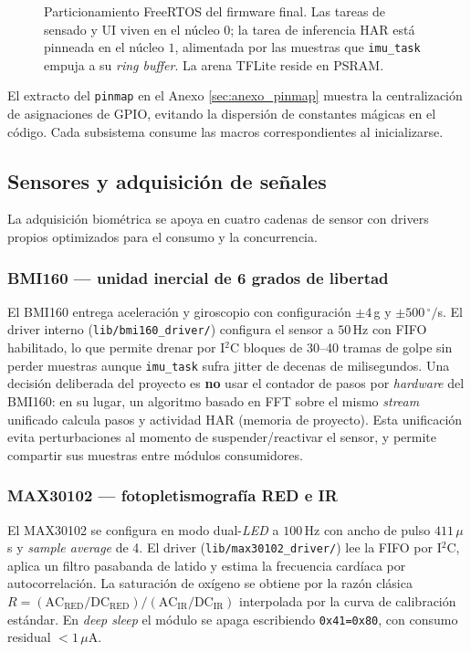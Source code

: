 \documentclass[letterpaper,11pt]{article}
\begin{document}
\begin{figure}[H]
    \centering
    \resizebox{0.88\textwidth}{!}{}
    \caption[Particionamiento FreeRTOS del firmware final]{Particionamiento FreeRTOS del firmware final. Las tareas de sensado y UI viven en el n\'ucleo $0$; la tarea de inferencia HAR est\'a pinneada en el n\'ucleo $1$, alimentada por las muestras que \texttt{imu\_task} empuja a su \textit{ring buffer}. La arena TFLite reside en PSRAM.}
    \label{fig:freertos}
\end{figure}

El extracto del \texttt{pinmap} en el Anexo \ref{sec:anexo_pinmap} muestra la centralizaci\'on de asignaciones de GPIO, evitando la dispersi\'on de constantes m\'agicas en el c\'odigo. Cada subsistema consume las macros correspondientes al inicializarse.

\subsection{Sensores y adquisici\'on de se\~nales}

La adquisici\'on biom\'etrica se apoya en cuatro cadenas de sensor con drivers propios optimizados para el consumo y la concurrencia.

\subsubsection*{BMI160 --- unidad inercial de 6 grados de libertad}
El BMI160 \cite{bmi160_ds} entrega aceleraci\'on y giroscopio con configuraci\'on $\pm 4$\,g y $\pm 500\,^\circ/$s. El driver interno (\texttt{lib/bmi160\_driver/}) configura el sensor a $50$\,Hz con FIFO habilitado, lo que permite drenar por I$^2$C bloques de 30--40 tramas de golpe sin perder muestras aunque \texttt{imu\_task} sufra jitter de decenas de milisegundos. Una decisi\'on deliberada del proyecto es \textbf{no} usar el contador de pasos por \textit{hardware} del BMI160: en su lugar, un algoritmo basado en FFT sobre el mismo \textit{stream} unificado calcula pasos y actividad HAR (memoria de proyecto). Esta unificaci\'on evita perturbaciones al momento de suspender/reactivar el sensor, y permite compartir sus muestras entre m\'odulos consumidores.

\subsubsection*{MAX30102 --- fotopletismograf\'ia RED e IR}
El MAX30102 \cite{max30102_ds} se configura en modo dual-\textit{LED} a $100$\,Hz con ancho de pulso $411\,\mu$s y \textit{sample average} de 4. El driver (\texttt{lib/max30102\_driver/}) lee la FIFO por I$^2$C, aplica un filtro pasabanda de latido y estima la frecuencia card\'iaca por autocorrelaci\'on. La saturaci\'on de ox\'igeno se obtiene por la raz\'on cl\'asica $R = (\text{AC}_\text{RED}/\text{DC}_\text{RED})/(\text{AC}_\text{IR}/\text{DC}_\text{IR})$ interpolada por la curva de calibraci\'on est\'andar. En \textit{deep sleep} el m\'odulo se apaga escribiendo \texttt{0x41=0x80}, con consumo residual $<1\,\mu$A.
\end{document}
